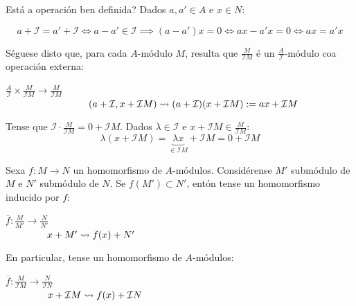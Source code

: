 \documentclass[twoside]{report}
\theoremstyle{mystyle}
\begin{document}
\noindent Está a operación ben definida? Dados $a,a' \in A$ e $x \in N$:

$$a + \mathcal{I} = a' + \mathcal{I} \Longleftrightarrow a - a' \in \mathcal{I} \implies (a - a')x = 0 \Longleftrightarrow ax - a'x = 0 \Longleftrightarrow ax = a'x$$

\noindent Séguese disto que, para cada $A$-módulo $M$, resulta que $\displaystyle \frac{M}{\mathcal{I}M}$ é un $\displaystyle \frac{A}{\mathcal{I}}$-módulo coa operación externa:

\begin{center}
    $\displaystyle \frac{A}{\mathcal{I}} \times \displaystyle \frac{M}{\mathcal{I}M} \longrightarrow \displaystyle \frac{M}{\mathcal{I}M}$\\
    \vspace{2mm}
    $\hspace{30mm} (a + \mathcal{I}, x + \mathcal{I}M) \leadsto (a + \mathcal{I})(x + \mathcal{I}M) := ax + \mathcal{I}M$
\end{center}

\noindent Tense que $\mathcal{I} \cdot \displaystyle \frac{M}{\mathcal{I}M} = 0 + \mathcal{I}M$. Dados $\lambda \in \mathcal{I}$ e $x + \mathcal{I}M \in \displaystyle \frac{M}{\mathcal{I}M}$:
$$\lambda(x + \mathcal{I}M) = \underbrace{\lambda x}_{\in \mathcal{I}M} + \mathcal{I}M = 0 + \mathcal{I}M$$

\noindent Sexa $f: M \longrightarrow N$ un homomorfismo de $A$-módulos. Considérense $M'$ submódulo de $M$ e $N'$ submódulo de $N$. Se $f(M') \subset N'$, entón tense un homomorfismo inducido por $f$:

\begin{center}
    $\overline{f}: \displaystyle \frac{M}{M'} \longrightarrow \displaystyle \frac{N}{N'}$\\
    \vspace{2mm}
    $\hspace{15mm} x + M' \leadsto f(x) + N'$
\end{center}

\noindent En particular, tense un homomorfismo de $A$-módulos:

\begin{center}
    $\overline{f}: \displaystyle \frac{M}{\mathcal{I}M} \longrightarrow \displaystyle \frac{N}{\mathcal{I}N}$\\
    \vspace{2mm}
    $\hspace{15mm} x + \mathcal{I}M \leadsto f(x) + \mathcal{I}N$
\end{center}
\end{document}
